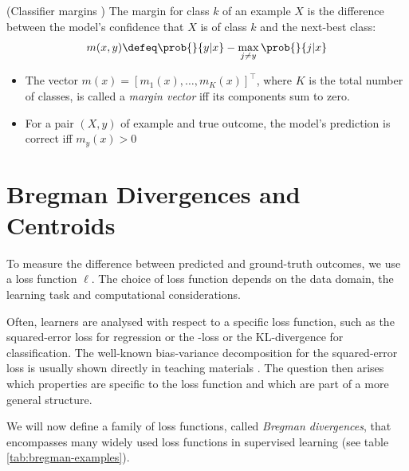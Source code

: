 \documentclass[
    a4paper, %
	fontsize=10pt, %
	twoside=false, %
]{kaobook}
\begin{document}
\begin{titlepage}
\begin{definition} (Classifier margins \cite{tibshirani_ElementsStatisticalLearning_2017}) The margin for class $k$ of an example $X$ is the difference between the model's confidence that $X$ is of class $k$ and the next-best class:
$$
m(x,y) \defeq \prob{}{y|x} - \max_{j\not=y} \prob{}{j|x}
$$
\begin{itemize}
    \item The vector $m(x) = [m_{1}(x), \dots, m_{K}(x)]^\top$, where $K$ is the total number of classes, is called a \textit{margin vector} iff its components sum to zero. 
    \item For a pair $(X,y)$ of example and true outcome, the model's prediction is correct iff $m_y(x) > 0$ 
\end{itemize}
\label{def:classifier-margin}
\end{definition}



\section{Bregman Divergences and Centroids}

To measure the difference between predicted and ground-truth outcomes, we use a loss function $\ell$. The choice of loss function depends on the data domain, the learning task and computational considerations. 

Often, learners are analysed with respect to a specific loss function, such as the squared-error loss \cite{scornet_ConsistencyRandomForests_2015} for regression or the \zeroone-loss \cite{theisen_WhenAreEnsembles_2023} or the KL-divergence \cite{webb_EnsembleNotEnsemble_2019} for classification. The well-known bias-variance decomposition for the squared-error loss is usually shown directly in teaching materials \cite{tibshirani_ElementsStatisticalLearning_2017, weinberger_Lecture12Bias_}. The question then arises which properties are specific to the loss function and which are part of a more general structure.

We will now define a family of loss functions, called \textit{Bregman divergences}, that encompasses many widely used loss functions in supervised learning (see table \ref{tab:bregman-examples}). 


\end{titlepage}
\end{document}
